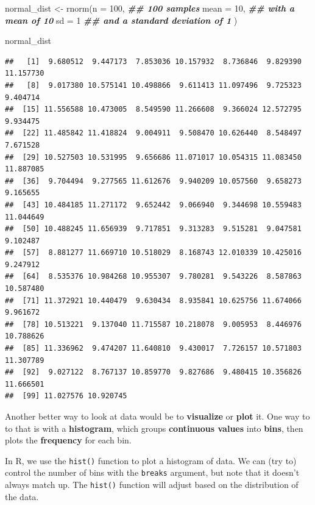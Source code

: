 \documentclass[
]{book}
\newenvironment{Shaded}{\begin{snugshade}}{\end{snugshade}}
\newcommand{\AttributeTok}[1]{\textcolor[rgb]{0.77,0.63,0.00}{#1}}
\newcommand{\DecValTok}[1]{\textcolor[rgb]{0.00,0.00,0.81}{#1}}
\newcommand{\DocumentationTok}[1]{\textcolor[rgb]{0.56,0.35,0.01}{\textbf{\textit{#1}}}}
\newcommand{\FunctionTok}[1]{\textcolor[rgb]{0.00,0.00,0.00}{#1}}
\newcommand{\NormalTok}[1]{#1}
\newcommand{\OtherTok}[1]{\textcolor[rgb]{0.56,0.35,0.01}{#1}}
\begin{document}
\begin{Shaded}
\begin{Highlighting}[]
\NormalTok{normal\_dist }\OtherTok{\textless{}{-}} \FunctionTok{rnorm}\NormalTok{(}\AttributeTok{n =} \DecValTok{100}\NormalTok{, }\DocumentationTok{\#\# 100 samples}
                     \AttributeTok{mean =} \DecValTok{10}\NormalTok{, }\DocumentationTok{\#\# with a mean of 10}
                     \AttributeTok{sd =} \DecValTok{1} \DocumentationTok{\#\# and a standard deviation of 1}
\NormalTok{                     )}


\NormalTok{normal\_dist}
\end{Highlighting}
\end{Shaded}

\begin{verbatim}
##   [1]  9.680512  9.447173  7.853036 10.157932  8.736846  9.829390 11.157730
##   [8]  9.017380 10.575141 10.498866  9.611413 11.097496  9.725323  9.404714
##  [15] 11.556588 10.473005  8.549590 11.266608  9.366024 12.572795  9.934475
##  [22] 11.485842 11.418824  9.004911  9.508470 10.626440  8.548497  7.671528
##  [29] 10.527503 10.531995  9.656686 11.071017 10.054315 11.083450 11.887085
##  [36]  9.704494  9.277565 11.612676  9.940209 10.057560  9.658273  9.165655
##  [43] 10.484185 11.271172  9.652442  9.066940  9.344698 10.559483 11.044649
##  [50] 10.488245 11.656939  9.717851  9.313283  9.515281  9.047581  9.102487
##  [57]  8.881277 11.669710 10.518029  8.168743 12.010339 10.425016  9.247912
##  [64]  8.535376 10.984268 10.955307  9.780281  9.543226  8.587863 10.587480
##  [71] 11.372921 10.440479  9.630434  8.935841 10.625756 11.674066  9.961672
##  [78] 10.513221  9.137040 11.715587 10.218078  9.005953  8.446976 10.788626
##  [85] 11.336962  9.474207 11.640810  9.430017  7.726157 10.571803 11.307789
##  [92]  9.027122  8.767137 10.859770  9.827686  9.480415 10.356826 11.666501
##  [99] 11.027576 10.920745
\end{verbatim}

Another better way to look at data would be to \textbf{visualize} or \textbf{plot} it. One way to to that is with a \textbf{histogram}, which groups \textbf{continuous values} into \textbf{bins}, then plots the \textbf{frequency} for each bin.

In R, we use the \texttt{hist()} function to plot a histogram of data. We can (try to) control the number of bins with the \texttt{breaks} argument, but note that it doesn't always match up. The \texttt{hist()} function will adjust based on the distribution of the data.
\end{document}

